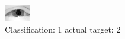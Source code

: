 \begin{figure}[h!]
\begin{center}
\includegraphics[width=0.60\columnwidth]{figures/ID2311_class_1_target_2.png}
\end{center}
\caption{ Classification: 1 actual target: 2}
\label{fig:ID2311_class_1_target_2}
\end{figure}
